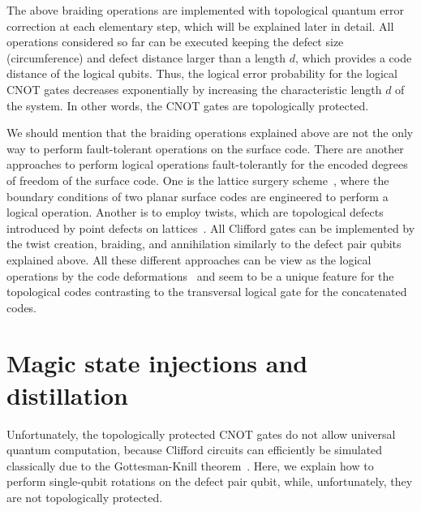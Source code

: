 The above braiding operations are implemented with topological quantum error correction at each elementary step, which will be explained later in detail.
All operations considered so far can be executed keeping the defect size (circumference) and defect distance larger than a length $d$, which provides a code distance of the logical qubits.
Thus, the logical error probability for the logical CNOT gates decreases exponentially by increasing the characteristic length $d$ of the system.
In other words, the CNOT gates are topologically protected.

We should mention that 
the braiding operations explained above are not the only way to 
perform fault-tolerant operations on the surface code.
There are another approaches to perform logical operations 
fault-tolerantly for the encoded degrees of freedom of the surface code.
One is the lattice surgery scheme~\cite{Horsman12},
where the boundary conditions of two planar surface codes 
are engineered to perform a logical operation.
Another is to employ twists,
which are topological defects introduced by
point defects on lattices~\cite{BombinTwist,Bombin11}.
All Clifford gates can be implemented by the
twist creation, braiding, and annihilation
similarly to the defect pair qubits explained above.
All these different approaches 
can be view as the logical operations by the code deformations~\cite{Dennis,RaussendorfAnn,Bombin09}
and seem to be a unique feature 
for the topological codes 
contrasting to the transversal logical gate for the concatenated codes.

\section{Magic state injections and distillation}
\label{Sec:MagicInjection}
Unfortunately, the topologically protected CNOT gates do not allow universal quantum computation, because Clifford circuits can efficiently be simulated classically due to the Gottesman-Knill theorem~\cite{GottesmanKnill}.
Here, we explain how to perform single-qubit rotations on the defect pair qubit, while, unfortunately, they are not topologically protected.

